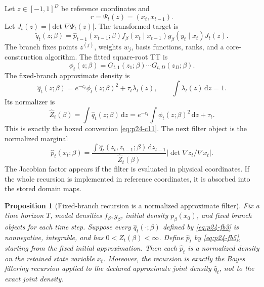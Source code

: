 \documentclass[11pt]{article}
\newtheorem{proposition}{Proposition}
\numberwithin{equation}{section}
\newcommand{\dd}{\,\mathrm d}
\begin{document}
Let \(z\in[-1,1]^D\) be reference coordinates and
\[
    r=\Psi_t(z)=(x_t,x_{t-1}).
\]
Let \(J_t(z)=|\det\nabla\Psi_t(z)|\).  The transformed target is
\begin{equation}
    \widetilde q_t(z;\beta)
    =
    \widehat p_{t-1}(x_{t-1};\beta)
    f_\beta(x_t\mid x_{t-1})
    g_\beta(y_t\mid x_t)
    J_t(z).
    \label{eq:p24-fb1}
\end{equation}
The branch fixes points \(z^{(j)}\), weights \(w_j\), basis functions, ranks,
and a core-construction algorithm.  The fitted square-root TT is
\begin{equation}
    \phi_t(z;\beta)=G_{t,1}(z_1;\beta)\cdots G_{t,D}(z_D;\beta).
    \label{eq:p24-fb2}
\end{equation}
The fixed-branch approximate density is
\begin{equation}
    \widehat q_t(z;\beta)
    =
    e^{-c_t}\phi_t(z;\beta)^2+\tau_t\lambda_t(z),
    \qquad
    \int\lambda_t(z)\dd z=1.
    \label{eq:p24-fb3}
\end{equation}
Its normalizer is
\begin{equation}
    \widehat Z_t(\beta)
    =
    \int\widehat q_t(z;\beta)\dd z
    =
    e^{-c_t}\int\phi_t(z;\beta)^2\dd z+\tau_t.
    \label{eq:p24-fb4}
\end{equation}
This is exactly the boxed convention \eqref{eq:p24-c11}.
The next filter object is the normalized marginal
\begin{equation}
    \widehat p_t(x_t;\beta)
    =
    \frac{
    \int \widehat q_t(z_t,z_{t-1};\beta)\dd z_{t-1}}
    {\widehat Z_t(\beta)}
    \left|\det\nabla z_t/\nabla x_t\right|.
    \label{eq:p24-fb5}
\end{equation}
The Jacobian factor appears if the filter is evaluated in physical coordinates.
If the whole recursion is implemented in reference coordinates, it is absorbed
into the stored domain maps.

\begin{proposition}[Fixed-branch recursion is a normalized approximate filter]
Fix a time horizon \(T\), model densities \(f_\beta,g_\beta\), initial density
\(p_\beta(x_0)\), and fixed branch objects for each time step.  Suppose every
\(\widehat q_t(\cdot;\beta)\) defined by \eqref{eq:p24-fb3} is nonnegative, integrable, and
has \(0<\widehat Z_t(\beta)<\infty\).  Define \(\widehat p_t\) by \eqref{eq:p24-fb5},
starting from the fixed initial approximation.  Then each \(\widehat p_t\) is a
normalized density on the retained state variable \(x_t\).  Moreover, the
recursion is exactly the Bayes filtering recursion applied to the declared
approximate joint density \(\widehat q_t\), not to the exact joint density.
\end{proposition}
\end{document}
